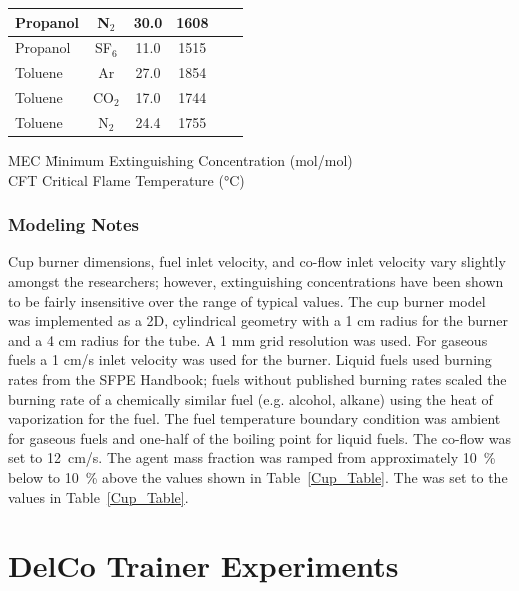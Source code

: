 \begin{table}[p]
\begin{tabular}{|l|c|c|c|c|l|}
Propanol   & N$_2$   & 30.0 & 1608 & \cite{Yamamoto:1,Sheinson:FSJ}  \\ \hline
Propanol   & SF$_6$  & 11.0 & 1515 & \cite{Sheinson:FSJ}  \\ \hline
Toluene    & Ar      & 27.0 & 1854 & \cite{Moore:1}  \\ \hline
Toluene    & CO$_2$  & 17.0 & 1744 & \cite{Yamamoto:1,Sakei:1}  \\ \hline
Toluene    & N$_2$   & 24.4 & 1755 & \cite{Yamamoto:1,Sakei:1}  \\ \hline
\end{tabular}
\noindent
\begin{tabbing}
MEC  \hspace{0.05in} \= Minimum Extinguishing Concentration (mol/mol) \\
CFT                  \> Critical Flame Temperature (\unit{\degreeCelsius})
\end{tabbing}
\end{table}


\subsubsection{Modeling Notes}

Cup burner dimensions, fuel inlet velocity, and co-flow inlet velocity vary slightly amongst the researchers; however, extinguishing concentrations have been shown to be fairly insensitive over the range of typical values. The cup burner model was implemented as a 2D, cylindrical geometry with a 1 cm radius for the burner and a 4 cm radius for the tube. A 1 mm grid resolution was used. For gaseous fuels a 1 cm/s inlet velocity was used for the burner. Liquid fuels used burning rates from the SFPE Handbook; fuels without published burning rates scaled the burning rate of a chemically similar fuel (e.g. alcohol, alkane) using the heat of vaporization for the fuel. The fuel temperature boundary condition was ambient for gaseous fuels and one-half of the boiling point for liquid fuels. The co-flow was set to 12~cm/s. The agent mass fraction was ramped from approximately 10~\% below to 10~\% above the values shown in Table~\ref{Cup_Table}. The  was set to the values in Table~\ref{Cup_Table}.

\section{DelCo Trainer Experiments}
\label{DelCo_Description}

